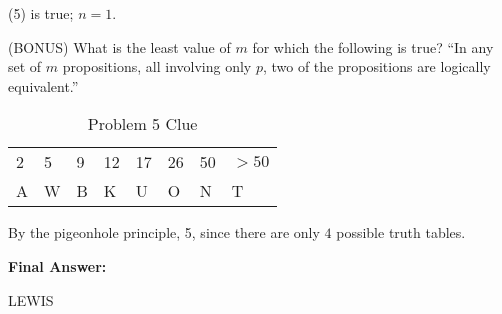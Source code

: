 \documentclass[solution, letterpaper]{cs20inclass}
\begin{document}
\begin{solution}
(5) is true; $n = 1$.
\end{solution}

\problem (BONUS) What is the least value of $m$ for which the following is true? ``In any set of $m$ propositions, all involving only $p$, two of the propositions are logically equivalent.''

\begin{table}[h]
\centering
\begin{tabular}{llllllll}
2 & 5 & 9 & 12 & 17 & 26 & 50 & $>50$ \\
A & W & B & K & U & O & N & T
\end{tabular}
\caption{Problem 5 Clue}
\end{table}

\begin{solution}
By the pigeonhole principle, 5, since there are only $4$ possible truth tables.
\end{solution}

\problem \textbf{Final Answer: }

\begin{solution}
LEWIS
\end{solution}
\end{document}
